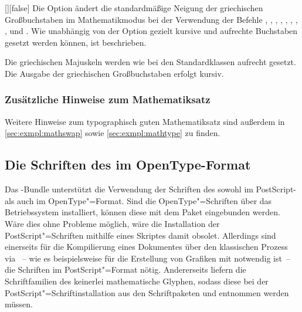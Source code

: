 \begin{Declaration}{[\PBoolean]}[false]
\printdeclarationlist%
%
%
%
Die Option ändert die standardmäßige Neigung der griechischen Großbuchstaben im 
Mathematikmodus bei der Verwendung der Befehle , , 
, , , , , 
,  und . Wie unabhängig von der Option 
 gezielt kursive und aufrechte Buchstaben gesetzt werden 
können, ist  beschrieben.
%
\begin{values}
\itemfalse
  Die griechischen Majuskeln werden wie bei den Standardklassen aufrecht 
  gesetzt.
\itemtrue*
  Die Ausgabe der griechischen Großbuchstaben erfolgt kursiv.
\end{values}
\end{Declaration}

\subsubsection{Zusätzliche Hinweise zum Mathematiksatz}
Weitere Hinweise zum typographisch guten Mathematiksatz sind außerdem in 
\autoref{sec:exmpl:mathswap} sowie \autoref{sec:exmpl:mathtype} zu finden.


\subsection{Die Schriften des \CDs im OpenType-Format}
\label{sec:fonts:fontspec}
%
Das \TUDScript-Bundle unterstützt die Verwendung der Schriften des \CDs sowohl 
im PostScript- als auch im OpenType"=Format. Sind die OpenType"=Schriften über 
das Betriebssystem installiert, können diese mit dem Paket  
eingebunden werden. Wäre dies ohne Probleme möglich, wäre die Installation der 
PostScript"=Schriften mithilfe eines Skriptes damit obsolet. Allerdings sind 
einerseits für die Kompilierung eines Dokumentes über den klassischen Prozess 
via ~-- wie es 
beispielsweise für die Erstellung von Grafiken mit  notwendig 
ist~-- die Schriften im PostScript"=Format nötig. Andererseits liefern die 
Schriftfamilien des \CDs keinerlei mathematische Glyphen, sodass diese bei der 
PostScript"=Schriftinstallation aus den Schriftpaketen  und 
 entnommen werden müssen.

